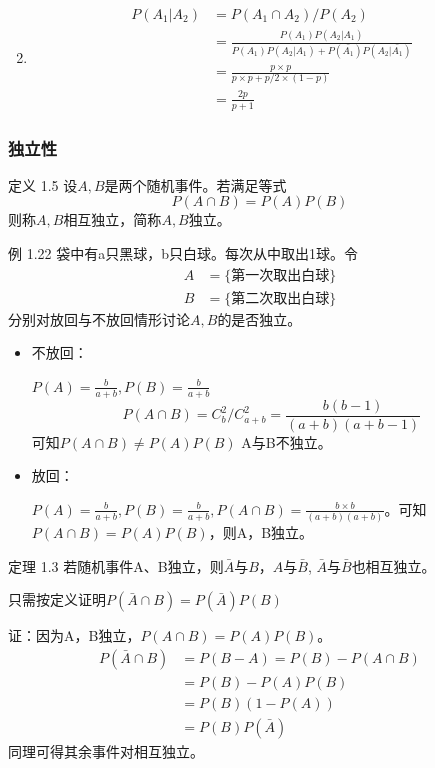 \documentclass{beamer}
\begin{document}
	\begin{frame}
		\begin{enumerate}\setcounter{enumi}{1}
			\item \begin{align}
				P(A_1 | A_2) & = P(A_1 \cap A_2) / P(A_2) \\
				& = \frac{P(A_1)P(A_2 |A_1)}{P(A_1)P(A_2 |A_1) + P(\bar{A_1})P(A_2 |\bar{A_1})} \\
				& = \frac{p \times p}{p \times p + p / 2 \times(1 - p)} \\
				& = \frac{2p}{p + 1}
			\end{align}
		\end{enumerate}
	\end{frame}
	
	\begin{frame}
		\frametitle{独立性}
		定义 1.5 设$A, B$是两个随机事件。若满足等式
		\[
		P(A \cap B) = P(A) P(B)
		\]
		则称$A, B$相互独立，简称$A, B$独立。
		
		\vspace{1cm}
		例 1.22 袋中有a只黑球，b只白球。每次从中取出1球。令
		\begin{align}
			A & = \{\text{第一次取出白球}\} \\
			B & = \{\text{第二次取出白球}\}
		\end{align}
		分别对放回与不放回情形讨论$A, B$的是否独立。
	\end{frame}
	
	\begin{frame}
		\begin{itemize}
			\item 不放回：
			
			$P(A) = \frac{b}{a + b}, P(B) = \frac{b}{a + b}$
			\[
			P(A \cap B) = C_b^2 / C_{a + b}^2 = \frac{b(b - 1)}{(a + b)(a + b -1)}
			\]
			可知$P(A \cap B) \neq P(A) P(B)$ A与B不独立。
			
			\item 放回：
			
			$P(A) = \frac{b}{a + b}, P(B) = \frac{b}{a + b}, P(A \cap B) = \frac{b \times b}{(a + b)(a + b)}$。可知$P(A \cap B) = P(A)P(B)$，则A，B独立。
			
		\end{itemize}
	\end{frame}
	
	\begin{frame}
		定理 1.3 若随机事件A、B独立，则$\bar{A} \text{与} B$，$A \text{与} \bar{B}$, $\bar{A} \text{与} \bar{B}$也相互独立。
		
		只需按定义证明$P(\bar{A} \cap B) = P(\bar{A}) P(B)$
		
		证：因为A，B独立，$P(A \cap B) = P(A) P(B)$。
		\begin{align}
			P(\bar{A} \cap B) & = P(B - A) = P(B) - P(A \cap B) \\
			& = P(B) - P(A)P(B) \\
			& = P(B)(1 - P(A)) \\
			& = P(B)P(\bar{A})
		\end{align}
		同理可得其余事件对相互独立。
	\end{frame}
	
\end{document}
